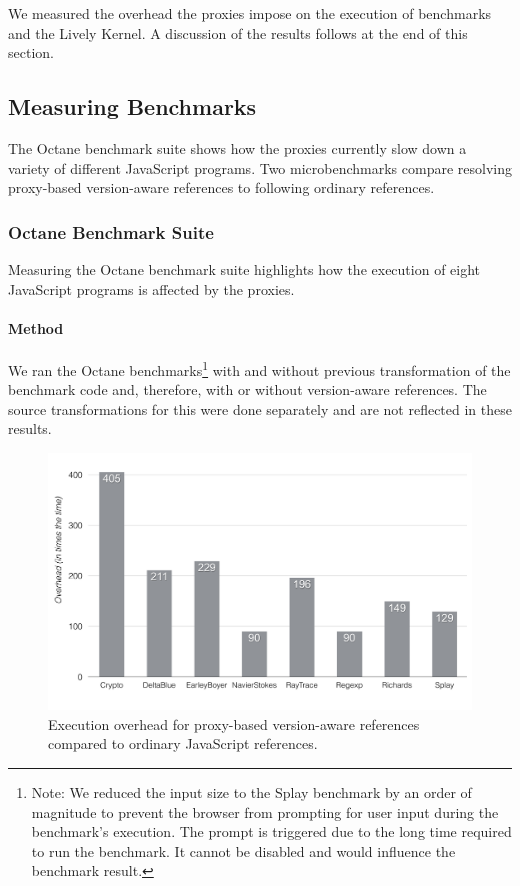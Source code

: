 We measured the overhead the proxies impose on the execution of benchmarks and the Lively Kernel.
A discussion of the results follows at the end of this section.


\subsection{Measuring Benchmarks}

The Octane benchmark suite shows how the proxies currently slow down a variety of different JavaScript programs.
Two microbenchmarks compare resolving proxy-based version-aware references to following ordinary references.

\subsubsection{Octane Benchmark Suite}

Measuring the Octane benchmark suite highlights how the execution of eight JavaScript programs is affected by the proxies.

\paragraph{Method}
We ran the Octane benchmarks\footnote{Note: We reduced the input size to the Splay benchmark by an order of magnitude to prevent the browser from prompting for user input during the benchmark's execution. The prompt is triggered due to the long time required to run the benchmark. It cannot be disabled and would influence the benchmark result.} with and without previous transformation of the benchmark code and, therefore, with or without version-aware references.
The source transformations for this were done separately and are not reflected in these results.

\begin{figure}[h]
    \centering
    \includegraphics[width=\textwidth]{figures/6_evaluation/3_executionOverhead.pdf}
    \caption{Execution overhead for proxy-based version-aware references compared to ordinary JavaScript references.}
    \label{fig:ExecutionOverhead}
\end{figure}

